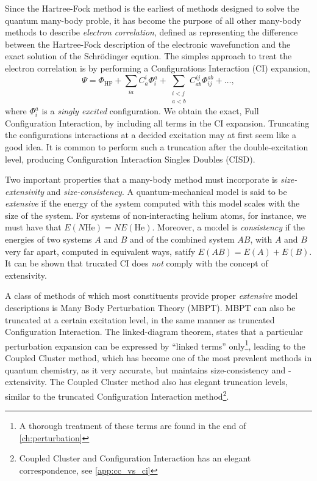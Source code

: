     Since the Hartree-Fock method is the earliest of methods designed to solve the quantum 
    many-body proble, it has become the purpose of all other many-body methods to describe 
    \emph{electron correlation}, defined as representing the difference between the 
    Hartree-Fock description of the electronic wavefunction and the exact solution of 
    the Schrödinger eqution. The simples approach to treat the electron correlation
    is by performing a Configurations Interaction (CI) expansion,
    \begin{equation}
        \Psi = \Phi_\text{HF} 
            + \sum_{ia} C^i_a\Phi^a_i 
            + \sum_{\substack{i < j \\ a < b}} C^{ij}_{ab} \Phi^{ab}_{ij} + \dots,
    \end{equation}
    where $\Phi^a_i$ is a \emph{singly excited} configuration. We obtain the exact,
    Full Configuration Interaction, by including all terms in the CI expansion.
    Truncating the configurations interactions at a decided excitation may at first 
    seem like a good idea. It is common to perform such a truncation after the 
    double-excitation level, producing Configuration Interaction Singles Doubles (CISD).

    Two important properties that a many-body method must incorporate is \emph{size-extensivity}
    and \emph{size-consistency}. A quantum-mechanical model is said to be \emph{extensive}
    if the energy of the system computed with this model scales with the size of the 
    system\cite{bartlett1978many}. For systems of non-interacting helium atoms, for instance,
    we must have that $E(N\text{He}) = NE(\text{He})$. Moreover, a mo:del is \emph{consistency}
    if the energies of two systems $A$ and $B$ and of the combined system $AB$, with 
    $A$ and $B$ very far apart, computed in equivalent ways, satify
    $E(AB) = E(A) + E(B)$\citeauthor{pople1976theoretical}. It can be shown that 
    trucated CI does \emph{not} comply with the concept of
    extensivity\cite{shavitt2009many}.

    A class of methods of which most constituents provide proper \emph{extensive} model
    descriptions is Many Body Perturbation Theory (MBPT)\cite{brueckner1955approximate}.
    MBPT can also be truncated at a certain 
    excitation level, in the same manner as truncated Configuration Interaction. 
    The linked-diagram theorem\cite{goldstone1957derivation}, states that a 
    particular perturbation expansion can be expressed by ``linked terms''
    only\footnote{A thorough treatment of these terms are found in the end of
    \autoref{ch:perturbation}},
    leading to the Coupled Cluster method\cite{coester1958bound,coester1960short},
    which has become one of the most prevalent methods in quantum chemistry,
    as it very accurate, but maintains size-consistency and -extensivity.
    The Coupled Cluster method also has elegant truncation levels, similar to the 
    truncated Configuration Interaction method\footnote{Coupled Cluster and
    Configuration Interaction has an elegant correspondence,
    see \autoref{app:cc_vs_ci}}.

